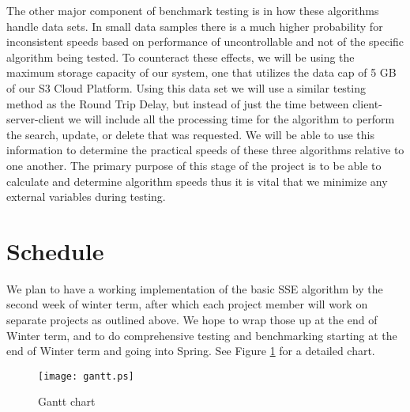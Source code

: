 The other major component of benchmark testing is in how these algorithms handle data sets.
In small data samples there is a much higher probability for inconsistent speeds based on performance of uncontrollable and not of the specific algorithm being tested.
To counteract these effects, we will be using the maximum storage capacity of our system, one that utilizes the data cap of 5 GB of our S3 Cloud Platform. Using this data set we will use a similar testing method as the Round Trip Delay, but instead of just the time between client-server-client we will include all the processing time for the algorithm to perform the search, update, or delete that was requested.
We will be able to use this information to determine the practical speeds of these three algorithms relative to one another.
The primary purpose of this stage of the project is to be able to calculate and determine algorithm speeds thus it is vital that we minimize any external variables during testing. 






\section {Schedule}

We plan to have a working implementation of the basic SSE algorithm by the second week of winter term, after which each project member will work on separate projects as outlined above.
We hope to wrap those up at the end of Winter term, and to do comprehensive testing and benchmarking starting at the end of Winter term and going into Spring.
See Figure \ref{figure:gantt} for a detailed chart.

\begin{figure}
\centering
\texttt{[image: gantt.ps]}
\caption{Gantt chart}
\label{figure:gantt}
\end{figure}


